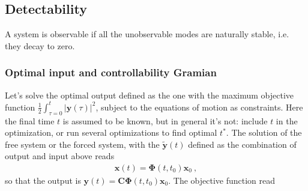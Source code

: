\documentclass[letterpaper,10pt,english]{jupyterBook}
\begin{document}
\subsection{Detectability}
\label{\detokenize{ch/system-theory/observability-detectability:detectability}}
\sphinxAtStartPar
A system is observable if all the unobservable modes are naturally stable, i.e. they decay to zero.

\sphinxAtStartPar
{} 
\subsubsection*{Optimal input and controllability Gramian }

\sphinxAtStartPar
Let’s solve the optimal output defined as the one with the maximum objective function \(\frac{1}{2}\int_{\tau=0}^{t} \left| \mathbf{y}(\tau) \right|^2\), subject to the equations of motion as constraints.  Here the final time \(t\) is assumed to be known, but in general it’s not: include \(t\) in the optimization, or run several optimizations to find optimal \(t^*\). The solution of the free system \sphinxhyphen{} or the forced system, with the \(\widetilde{\mathbf{y}}(t)\) defined as the combination of output and input above \sphinxhyphen{} reads
\begin{equation*}
\begin{split}\mathbf{x}(t) = \boldsymbol\Phi(t,t_0) \mathbf{x}_0 \ ,\end{split}
\end{equation*}
\sphinxAtStartPar
so that the output is \(\mathbf{y}(t) = \mathbf{C} \boldsymbol\Phi(t,t_0) \mathbf{x}_0\). The objective function read
\end{document}
